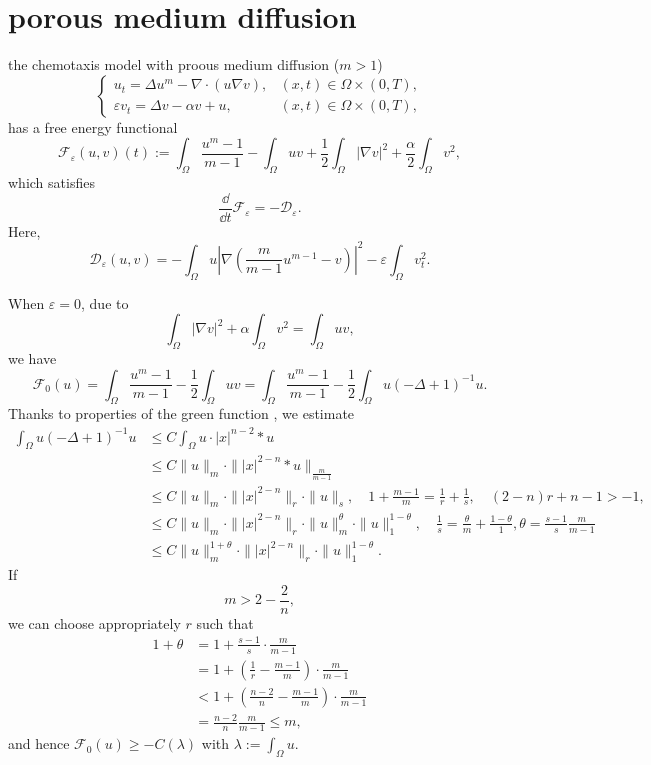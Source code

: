 \section{porous medium diffusion}
the chemotaxis model with proous medium diffusion ($m>1$)
\begin{equation}
	\begin{cases}
		u_t = \Delta u^m - \nabla \cdot ( u\nabla v), & (x,t)\in\Omega\times(0,T),\\
		\varepsilon v_t = \Delta v - \alpha v + u, & (x,t)\in\Omega\times(0,T),
	\end{cases}
\end{equation}
has a free energy functional
\begin{equation}
	\mathcal{F}_\varepsilon(u,v)(t) :=  \int_\Omega \frac{u^m-1}{m-1} - \int_\Omega uv 
		+ \frac{1}{2}\int_\Omega |\nabla v|^2 + \frac{\alpha}{2}\int_\Omega v^2,
\end{equation}
which satisfies 
\begin{equation}
	\frac{\dd}{\dd t}\mathcal{F}_\varepsilon = - \mathcal{D}_\varepsilon.
\end{equation}
Here, 
\begin{equation*}
	\mathcal{D}_\varepsilon(u,v) 
		= - \int_\Omega u\left|\nabla\left(\frac{m}{m-1}u^{m-1} - v\right)\right|^2
			- \varepsilon\int_\Omega v_t^2.
\end{equation*}

When $\varepsilon = 0$, due to
\[
	\int_\Omega |\nabla v|^2 + \alpha\int_\Omega v^2 = \int_\Omega uv,
\]
we have
\begin{equation}
	\mathcal{F}_0(u) = \int_\Omega \frac{u^m-1}{m-1} - \frac{1}{2}\int_\Omega uv 
		= \int_\Omega\frac{u^m-1}{m-1} - \frac{1}{2}\int_\Omega u(-\Delta + 1)^{-1}u.
\end{equation}
Thanks to properties of the green function \cite{Grueter1982},
we estimate
\begin{align*}
	\int_\Omega u(-\Delta+1)^{-1}u 
		&\leq C\int_\Omega u\cdot |x|^{n-2}*u\\
		&\leq C\|u\|_m\cdot \||x|^{2-n}*u\|_{\frac{m}{m-1}}\\
		&\leq C\|u\|_m \cdot \||x|^{2-n}\|_r\cdot\|u\|_s,\quad 1+\frac{m-1}{m} = \frac{1}{r} + \frac{1}{s},
			\quad (2-n)r + n-1 > -1,\\
		&\leq C\|u\|_m\cdot \||x|^{2-n}\|_r\cdot\|u\|_m^{\theta}\cdot\|u\|_1^{1-\theta},
			\quad \frac{1}{s} = \frac{\theta}{m} + \frac{1-\theta}{1}, \theta = \frac{s-1}{s}\frac{m}{m-1}\\
		&\leq C\|u\|_m^{1+\theta}\cdot \||x|^{2-n}\|_r\cdot\|u\|_1^{1-\theta}.
\end{align*}
If 
\[
	m > 2-\frac2n,
\]
we can choose appropriately $r$ such that 
\begin{align*}
	1+\theta 
		&= 1+\frac{s-1}{s}\cdot\frac{m}{m-1}\\
		&= 1 + \left(\frac1r-\frac{m-1}{m}\right)\cdot\frac{m}{m-1}\\
		&< 1 + \left(\frac{n-2}{n} - \frac{m-1}{m}\right)\cdot\frac{m}{m-1}\\
		&= \frac{n-2}{n}\frac{m}{m-1}\leq m,
\end{align*} 
and hence $\mathcal{F}_0(u) \geq - C(\lambda)$ with $\lambda := \int_\Omega u$.


